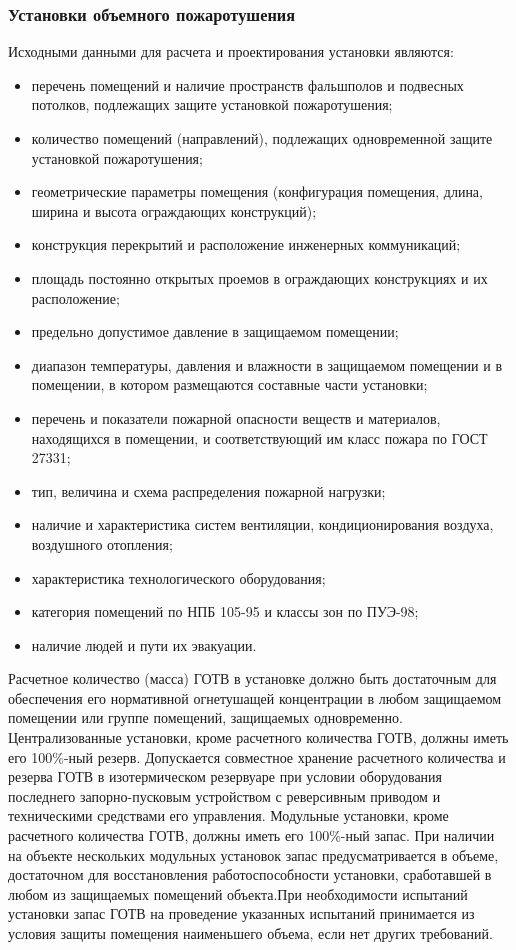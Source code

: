 \subsubsection{Установки объемного пожаротушения}

Исходными данными для расчета и проектирования установки являются:
\begin{itemize}
\item перечень помещений и наличие пространств фальшполов и подвесных потолков, подлежащих защите установкой пожаротушения;
\item количество помещений (направлений), подлежащих одновременной защите установкой пожаротушения;
\item геометрические параметры помещения (конфигурация помещения, длина, ширина и высота ограждающих конструкций);
\item конструкция перекрытий и расположение инженерных коммуникаций;
\item площадь постоянно открытых проемов в ограждающих конструкциях и их расположение;
\item предельно допустимое давление в защищаемом помещении;
\item диапазон температуры, давления и влажности в защищаемом помещении и в помещении, в котором размещаются
составные части установки;
\item перечень и показатели пожарной опасности веществ и материалов, находящихся в помещении, и соответствующий им класс пожара
по ГОСТ 27331;
\item тип, величина и схема распределения пожарной нагрузки;
\item наличие и характеристика систем вентиляции, кондиционирования воздуха, воздушного отопления;
\item характеристика технологического оборудования;
\item категория помещений по НПБ 105-95 и классы зон по ПУЭ-98;
\item наличие людей и пути их эвакуации.
\end{itemize}

Расчетное количество (масса) ГОТВ в установке должно быть достаточным для обеспечения его нормативной огнетушащей концентрации в
любом защищаемом помещении или группе помещений, защищаемых одновременно. Централизованные установки, кроме расчетного количества
ГОТВ, должны иметь его 100\%-ный резерв. Допускается совместное хранение расчетного количества и резерва ГОТВ в изотермическом
резервуаре при условии оборудования последнего запорно-пусковым устройством с реверсивным приводом и техническими средствами
его управления. Модульные установки, кроме расчетного количества ГОТВ, должны иметь его 100\%-ный запас. При наличии на объекте
нескольких модульных установок запас предусматривается в объеме, достаточном для восстановления работоспособности установки,
сработавшей в любом из защищаемых помещений объекта.При необходимости испытаний установки запас ГОТВ на проведение указанных
испытаний принимается из условия защиты помещения наименьшего объема, если нет других требований.

